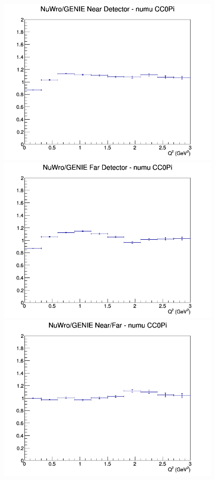 \documentclass[12pt]{article}
\begin{document}
\begin{figure}[h]
\endminipage
\newline
{}
\includegraphics[width=\linewidth]{Q2/nominal/ratios/CC0Pi_NuWro_GENIE_numu_near_Q2.png}
\endminipage
{}
\includegraphics[width=\linewidth]{Q2/nominal/ratios/CC0Pi_NuWro_GENIE_numu_far_Q2.png}
\endminipage
{}
\includegraphics[width=\linewidth]{Q2/nominal/ratios/CC0Pi_NuWro_GENIE_numu_NF_Q2.png}
\endminipage
\newline
\end{figure}
\clearpage
\end{document}
